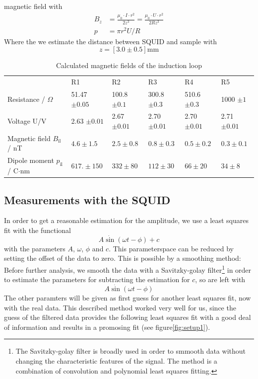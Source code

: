 magnetic field with 
\begin{align}
B_z     &= \frac{\mu_0\cdot I \cdot r^2}{2z^3} = \frac{\mu_0\cdot U \cdot r^2}{2Rz^3}\\ 
p       &= \pi r^2 U / R 
\end{align}
Where the we estimate the distance between SQUID and sample with
\begin{equation}
z = \left[ 3.0 \pm 0.5 \right]\mathrm{mm}
\end{equation}
\begin{table}[htb]
\caption{Calculated magnetic fields of the induction loop}
\begin{tabular}{ l| p{2cm}|p{2cm}|p{2cm}|p{2cm}|p{2cm}}
 \rowcolor{tabcolor}& R1 & R2 & R3 & R4 & R5 \\ 
Resistance / $\Omega$ & 51.47  $\pm 0.05$ & 100.8  $\pm 0.1$& 300.8 $\pm 0.3$& 510.6 $\pm 0.3$ & 1000 $\pm 1$\\  
Voltage U/V           & 2.63 $\pm 0.01$ & 2.67 $\pm 0.01$& 2.70 $\pm 0.01$& 2.70 $\pm 0.01$& 2.71 $\pm 0.01$\\
Magnetic field $B_{\mathrm{il}}$ / nT &$4.6\pm1.5$&$2.5\pm0.8$&$0.8\pm0.3$&$0.5\pm0.2$&$0.3\pm0.1$ \\ 
Dipole moment $p_{\mathrm{il}}$ / C$\cdot$nm&$617. \pm 150$&$332 \pm 80$&$112 \pm 30$&$66 \pm 20$&$34 \pm 8$\\
\end{tabular}
\end{table}

\subsection{Measurements with the SQUID}

In order to get a reasonable estimation for the amplitude, we use a least
squares fit with the functional
\begin{equation}
A \dot \sin (\omega t - \phi ) + c
\end{equation}
with the parameters $A$, $\omega$, $\phi$ and $c$. This parameterspace can be
reduced by setting the offset of the data to zero. This is possible by a 
smoothing method: Before further analysis, we smooth the data with a
Savitzky-golay filter\footnote{The Savitzky-golay filter is broadly used
in order to smmooth data without changing the characteristic features of the 
signal. The method is a combination of convolution and polynomial least
squares fitting.} in order to estimate the parameters for 
subtracting the estimation for $c$, so are left with
\begin{equation}
A \dot \sin (\omega t - \phi ) 
\end{equation}
The other paramters will be given as
first guess for another least squares fit, now with the real data. This
described method worked very well for us, since the guess of the filtered data
provides the following least squares fit with a good deal of information and
results in a promosing fit (see figure\ref{fig:setup1}). 

